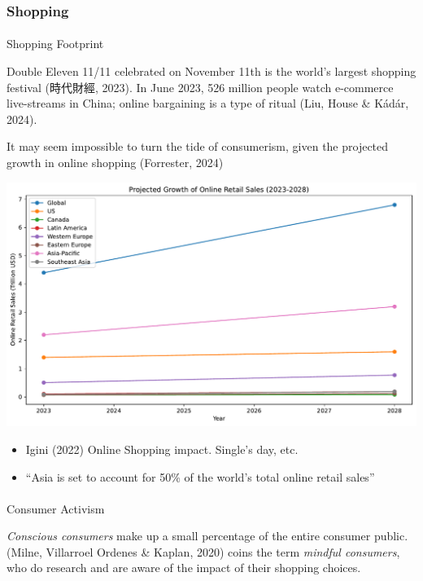 \documentclass[
  letterpaper,
  DIV=11,
  numbers=noendperiod]{scrartcl}
\makeatletter
\let\oldparagraph\paragraph
\renewcommand{\paragraph}{
    \@ifstar
      \xxxParagraphStar
      \xxxParagraphNoStar
  }
\newcommand{\xxxParagraphStar}[1]{\oldparagraph*{#1}\mbox{}}
\newcommand{\xxxParagraphNoStar}[1]{\oldparagraph{#1}\mbox{}}
\makeatother
\begin{document}
\subsubsection{Shopping}\label{shopping}

\paragraph{Shopping Footprint}\label{shopping-footprint}

Double Eleven 11/11 celebrated on November 11th is the world's largest
shopping festival (時代財經, 2023). In June 2023, 526 million people
watch e-commerce live-streams in China; online bargaining is a type of
ritual (Liu, House \& Kádár, 2024).

It may seem impossible to turn the tide of consumerism, given the
projected growth in online shopping (Forrester, 2024)

\includegraphics{_thesis_files/figure-pdf/cell-32-output-1.pdf}

\begin{itemize}
\item
  Igini (2022) Online Shopping impact. Single's day, etc.
\item
  ``Asia is set to account for 50\% of the world's total online retail
  sales''
\end{itemize}

\paragraph{Consumer Activism}\label{consumer-activism}

\emph{Conscious consumers} make up a small percentage of the entire
consumer public. (Milne, Villarroel Ordenes \& Kaplan, 2020) coins the
term \emph{mindful consumers}, who do research and are aware of the
impact of their shopping choices.
\end{document}
